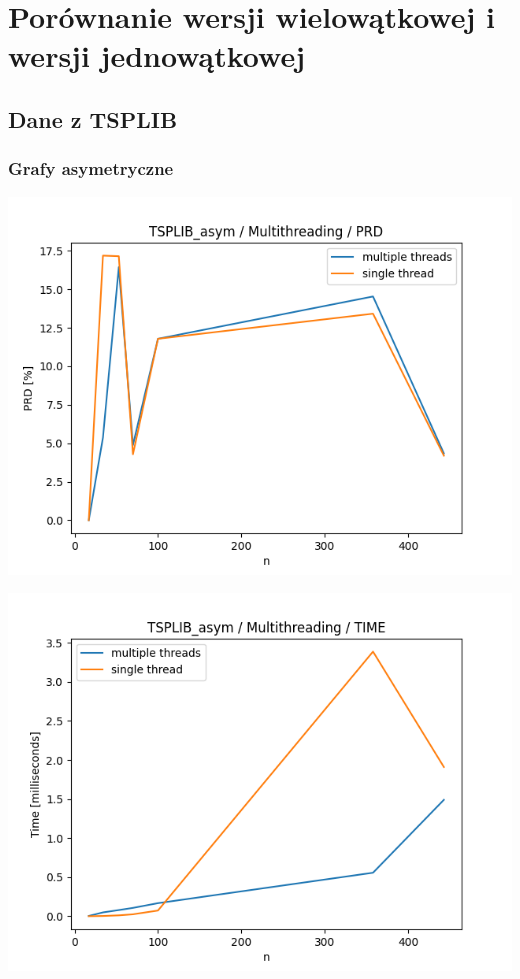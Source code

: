 \documentclass{article}
\begin{document}
\section{Porównanie wersji wielowątkowej i wersji jednowątkowej}

\subsection{Dane z TSPLIB}

\subsubsection{Grafy asymetryczne}

\begin{center}
\includegraphics[width=\textwidth, 
                   height = 0.4\textheight, 
                   keepaspectratio]
                  {plots/multithreading_tsplib_asym_prd} 
\end{center}

\begin{center}
\includegraphics[width=\textwidth, 
                   height = 0.4\textheight, 
                   keepaspectratio]
                  {plots/multithreading_tsplib_asym_time} 
\end{center}
\end{document}
